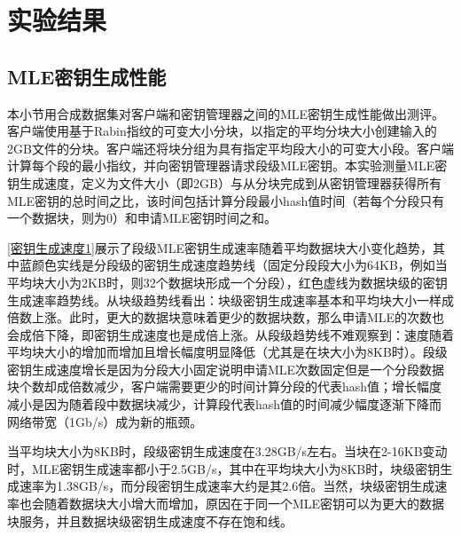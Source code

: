 \documentclass[promaster]{thesis-uestc}
\begin{document}
\section{实验结果}
\subsection{MLE密钥生成性能}\label{MLE密钥生成性能}
本小节用合成数据集对客户端和密钥管理器之间的MLE密钥生成性能做出测评。客户端使用基于Rabin指纹的可变大小分块，以指定的平均分块大小创建输入的2GB文件的分块。客户端还将块分组为具有指定平均段大小的可变大小段。客户端计算每个段的最小指纹，并向密钥管理器请求段级MLE密钥。本实验测量MLE密钥生成速度，定义为文件大小（即2GB）与从分块完成到从密钥管理器获得所有MLE密钥的总时间之比，该时间包括计算分段最小hash值时间（若每个分段只有一个数据块，则为0）和申请MLE密钥时间之和。

\ref{密钥生成速度1}展示了段级MLE密钥生成速率随着平均数据块大小变化趋势，其中蓝颜色实线是分段级的密钥生成速度趋势线（固定分段段大小为64KB，例如当平均块大小为2KB时，则32个数据块形成一个分段），红色虚线为数据块级的密钥生成速率趋势线。从块级趋势线看出：块级密钥生成速率基本和平均块大小一样成倍数上涨。此时，更大的数据块意味着更少的数据块数，那么申请MLE的次数也会成倍下降，即密钥生成速度也是成倍上涨。从段级趋势线不难观察到：速度随着平均块大小的增加而增加且增长幅度明显降低（尤其是在块大小为8KB时）。段级密钥生成速度增长是因为分段大小固定说明申请MLE次数固定但是一个分段数据块个数却成倍数减少，客户端需要更少的时间计算分段的代表hash值；增长幅度减小是因为随着段中数据块减少，计算段代表hash值的时间减少幅度逐渐下降而网络带宽（1Gb/s）成为新的瓶颈。

当平均块大小为8KB时，段级密钥生成速度在3.28GB/s左右。当块在2-16KB变动时，MLE密钥生成速率都小于2.5GB/s，其中在平均块大小为8KB时，块级密钥生成速率为1.38GB/s，而分段密钥生成速率大约是其2.6倍。当然，块级密钥生成速率也会随着数据块大小增大而增加，原因在于同一个MLE密钥可以为更大的数据块服务，并且数据块级密钥生成速度不存在饱和线。
\end{document}
